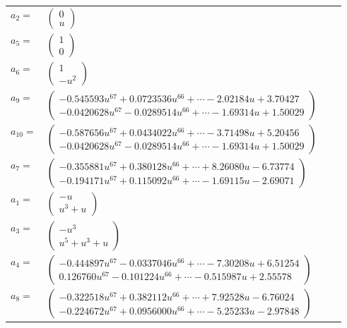 \documentclass[1p]{elsarticle_modified}
\theoremstyle{definition}
\begin{document}
\begin{tabular}{m{7pt} m{180pt} m{7pt} m{180pt} }
\flushright $a_{2}=$&$\begin{pmatrix}0\\u\end{pmatrix}$ \\
\flushright $a_{5}=$&$\begin{pmatrix}1\\0\end{pmatrix}$ \\
\flushright $a_{6}=$&$\begin{pmatrix}1\\- u^2\end{pmatrix}$ \\
\flushright $a_{9}=$&$\begin{pmatrix}-0.545593 u^{67}+0.0723536 u^{66}+\cdots-2.02184 u+3.70427\\-0.0420628 u^{67}-0.0289514 u^{66}+\cdots-1.69314 u+1.50029\end{pmatrix}$ \\
\flushright $a_{10}=$&$\begin{pmatrix}-0.587656 u^{67}+0.0434022 u^{66}+\cdots-3.71498 u+5.20456\\-0.0420628 u^{67}-0.0289514 u^{66}+\cdots-1.69314 u+1.50029\end{pmatrix}$ \\
\flushright $a_{7}=$&$\begin{pmatrix}-0.355881 u^{67}+0.380128 u^{66}+\cdots+8.26080 u-6.73774\\-0.194171 u^{67}+0.115092 u^{66}+\cdots-1.69115 u-2.69071\end{pmatrix}$ \\
\flushright $a_{1}=$&$\begin{pmatrix}- u\\u^3+u\end{pmatrix}$ \\
\flushright $a_{3}=$&$\begin{pmatrix}- u^3\\u^5+u^3+u\end{pmatrix}$ \\
\flushright $a_{4}=$&$\begin{pmatrix}-0.444897 u^{67}-0.0337046 u^{66}+\cdots-7.30208 u+6.51254\\0.126760 u^{67}-0.101224 u^{66}+\cdots-0.515987 u+2.55578\end{pmatrix}$ \\
\flushright $a_{8}=$&$\begin{pmatrix}-0.322518 u^{67}+0.382112 u^{66}+\cdots+7.92528 u-6.76024\\-0.224672 u^{67}+0.0956000 u^{66}+\cdots-5.25233 u-2.97848\end{pmatrix}$ \\

\end{tabular}
\end{document}
